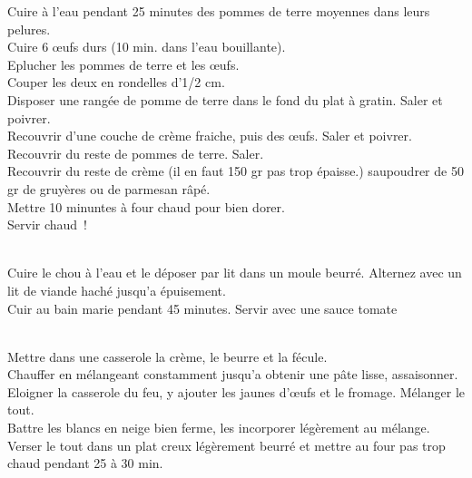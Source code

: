 \begin{minipage}[c]{\textwidth}
Cuire à l’eau pendant 25 minutes des pommes de terre moyennes dans leurs pelures.\\
Cuire 6 œufs durs (10 min. dans l’eau bouillante).\\
Eplucher les pommes de terre et les œufs. \\
Couper les deux en rondelles d’1/2 cm. \\
Disposer une rangée de pomme de terre dans le fond du plat à gratin. Saler et poivrer. \\
Recouvrir d’une couche de crème fraiche, puis des œufs. Saler et poivrer. \\
Recouvrir du reste de pommes de terre. Saler.\\
Recouvrir du reste de crème (il en faut 150 gr pas trop épaisse.) saupoudrer de 50 gr de gruyères ou de parmesan râpé.\\
Mettre 10 minuntes à four chaud pour bien dorer. \\
Servir chaud !\\
\\

\end{minipage}

\begin{minipage}[c]{\textwidth}
Cuire le chou à l'eau et le déposer par lit dans un moule beurré. Alternez avec un lit de viande haché jusqu'a épuisement.\\
Cuir au bain marie pendant 45 minutes. Servir avec une sauce tomate\\
\\

\end{minipage}

\begin{minipage}[c]{\textwidth}
Mettre dans une casserole la crème, le beurre et la fécule.\\
Chauffer en mélangeant constamment jusqu'a obtenir une pâte lisse, assaisonner.\\
Eloigner la casserole du feu, y  ajouter les jaunes d’œufs et le fromage. Mélanger le tout.\\
Battre les blancs en neige bien ferme, les incorporer légèrement au mélange.\\
Verser le tout dans un plat creux légèrement beurré et mettre au four pas trop chaud pendant 25 à 30 min. \\
\\

\end{minipage}

